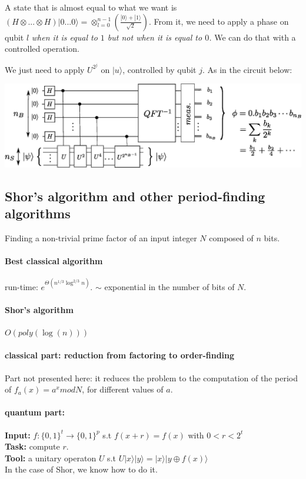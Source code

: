\documentclass{article}
\begin{document}
A state that is almost equal to what we want is $\left(H\otimes ... \otimes H\right) |0...0\rangle = \otimes_{l=0}^{n-1} \left(\frac{|0\rangle+|1\rangle}{\sqrt{2}}\right)$. From it, we need to apply a phase on qubit $l$ \emph{when it is equal to $1$ but not when it is equal to $0$.} We can do that with a controlled operation.

We just need to apply $U^{2^j}$ on $|u\rangle$, controlled by qubit $j$.
As in the circuit below:
\begin{center}
    \includegraphics[width=\textwidth]{quantum_phase_estimation.eps}
\end{center}

\subsection{Shor's algorithm and other period-finding algorithms}

Finding a non-trivial prime factor of an input integer $N$ composed 
of $n$ bits. 

\paragraph{Best classical algorithm} run-time: 
$e^{\Theta(n^{1/3}\log^{2/3} n)}$. $\sim$ exponential in the number of bits of $N$.

\paragraph{Shor's algorithm} $O(poly(\log(n)))$

\paragraph{classical part: reduction from factoring to order-finding}
Part not presented here: it reduces the problem to the computation
of the period of $f_a(x)=a^x mod N$, for different values of $a$.

\paragraph{quantum part: }
\textbf{Input:} $f:\{0,1\}^{t}\rightarrow \{0,1\}^{p}$ s.t
$f(x+r)=f(x)$ with $0<r<2^t$\\
\textbf{Task:} compute $r$.\\
\textbf{Tool:} a unitary operaton $U$ s.t $U|x\rangle|y\rangle = |x\rangle
|y\oplus f(x)\rangle$\\
In the case of Shor, we know how to do it.
\end{document}
